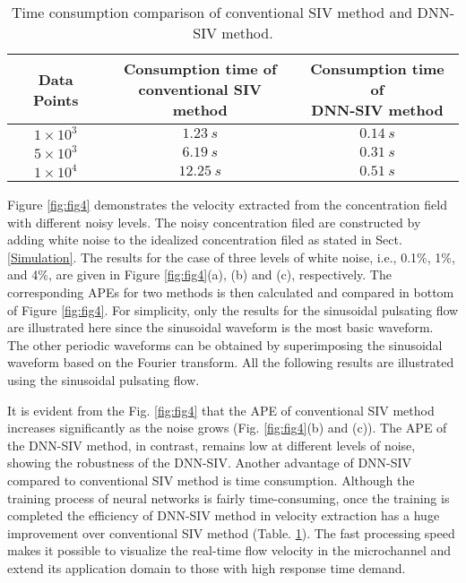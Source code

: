 \documentclass{article}
\begin{document}
\begin{table}
	\caption{Time consumption comparison of conventional SIV method and DNN-SIV method.}
	\centering
	\begin{tabular}{ccc}
		\toprule
		Data Points & \makecell{Consumption time of \\conventional SIV method} &
		\makecell{Consumption time of \\DNN-SIV method} \\
		\midrule
		$1\times10^3$   & $1.23~s$  & $0.14~s$ \\
		$5\times10^3$   & $6.19~s$  & $0.31~s$ \\
		$1\times10^4$   & $12.25~s$ & $0.51~s$ \\
		\bottomrule
	\end{tabular}
	\label{tab:table2}
\end{table}

Figure \ref{fig:fig4} demonstrates the velocity extracted from the concentration field with different noisy levels. The noisy concentration filed are constructed by adding white noise to the idealized concentration filed as stated in Sect. \ref{Simulation}. The results for the case of three levels of white noise, i.e., 0.1\%, 1\%, and 4\%, are given in Figure \ref{fig:fig4}(a), (b) and (c), respectively. The corresponding APEs for two methods is then calculated and compared in bottom of Figure \ref{fig:fig4}. For simplicity, only the results for the sinusoidal pulsating flow are illustrated here since the sinusoidal waveform is the most basic waveform. The other periodic waveforms can be obtained by superimposing the sinusoidal waveform based on the Fourier transform. All the following results are illustrated using the sinusoidal pulsating flow. \par
It is evident from the Fig. \ref{fig:fig4} that the APE of conventional SIV method increases significantly as the noise grows (Fig. \ref{fig:fig4}(b) and (c)). The APE of the DNN-SIV method, in contrast, remains low at different levels of noise, showing the robustness of the DNN-SIV. Another advantage of DNN-SIV compared to conventional SIV method is time consumption. Although the training process of neural networks is fairly time-consuming, once the training is completed the efficiency of DNN-SIV method in velocity extraction has a huge improvement over conventional SIV method (Table. \ref{tab:table2}). The fast processing speed makes it possible to visualize the real-time flow velocity in the microchannel and extend its application domain to those with high response time demand.
\end{document}
